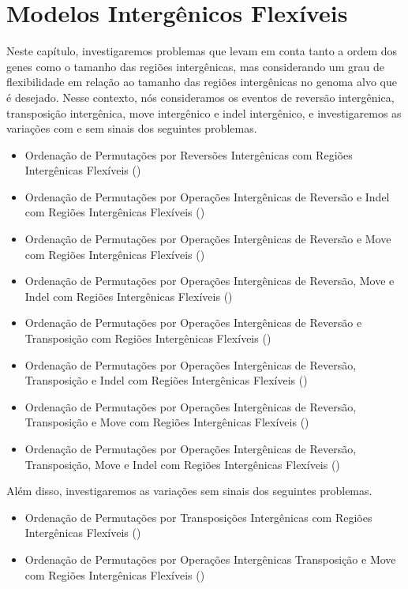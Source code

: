 \chapter{Modelos Intergênicos Flexíveis}\label{chapter:GMJBMTWF}

Neste capítulo, investigaremos problemas que levam em conta tanto a ordem dos genes como o tamanho das regiões intergênicas, mas considerando um grau de flexibilidade em relação ao tamanho das regiões intergênicas no genoma alvo que é desejado. Nesse contexto, nós consideramos os eventos de reversão intergênica, transposição intergênica, move intergênico e indel intergênico, e investigaremos as variações com e sem sinais dos seguintes problemas.

\begin{itemize}
  \item Ordenação de Permutações por Reversões Intergênicas com Regiões Intergênicas Flexíveis (\SbFIR)
  \item Ordenação de Permutações por Operações Intergênicas de Reversão e Indel com Regiões Intergênicas Flexíveis (\SbFIRI)
  \item Ordenação de Permutações por Operações Intergênicas de Reversão e Move com Regiões Intergênicas Flexíveis (\SbFIRM)
  \item Ordenação de Permutações por Operações Intergênicas de Reversão, Move e Indel com Regiões Intergênicas Flexíveis (\SbFIRMI)
  \item Ordenação de Permutações por Operações Intergênicas de Reversão e Transposição com Regiões Intergênicas Flexíveis (\SbFIRT)
  \item Ordenação de Permutações por Operações Intergênicas de Reversão, Transposição e Indel com Regiões Intergênicas Flexíveis (\SbFIRTI)
  \item Ordenação de Permutações por Operações Intergênicas de Reversão, Transposição e Move com Regiões Intergênicas Flexíveis (\SbFIRTM)
  \item Ordenação de Permutações por Operações Intergênicas de Reversão, Transposição, Move e Indel com Regiões Intergênicas Flexíveis (\SbFIRTMI)
\end{itemize}

Além disso, investigaremos as variações sem sinais dos seguintes problemas.

\begin{itemize}
  \item Ordenação de Permutações por Transposições Intergênicas com Regiões Intergênicas Flexíveis (\SbFIT)
  \item Ordenação de Permutações por Operações Intergênicas Transposição e Move com Regiões Intergênicas Flexíveis (\SbFITM)
\end{itemize}

